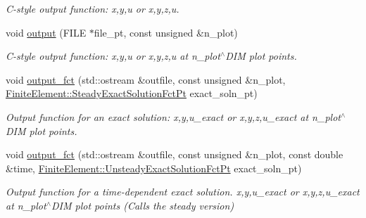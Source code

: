 \begin{DoxyCompactItemize}
\begin{DoxyCompactList}\small\item\em C-\/style output function\+: x,y,u or x,y,z,u. \end{DoxyCompactList}\item 
void \hyperlink{classoomph_1_1QSpectralPoissonElement_aa3a03bc9793e976facde1a49396f5b43}{output} (F\+I\+LE $\ast$file\+\_\+pt, const unsigned \&n\+\_\+plot)
\begin{DoxyCompactList}\small\item\em C-\/style output function\+: x,y,u or x,y,z,u at n\+\_\+plot$^\wedge$\+D\+IM plot points. \end{DoxyCompactList}\item 
void \hyperlink{classoomph_1_1QSpectralPoissonElement_a112f8c43964b2514296974a90dc4b587}{output\+\_\+fct} (std\+::ostream \&outfile, const unsigned \&n\+\_\+plot, \hyperlink{classoomph_1_1FiniteElement_a690fd33af26cc3e84f39bba6d5a85202}{Finite\+Element\+::\+Steady\+Exact\+Solution\+Fct\+Pt} exact\+\_\+soln\+\_\+pt)
\begin{DoxyCompactList}\small\item\em Output function for an exact solution\+: x,y,u\+\_\+exact or x,y,z,u\+\_\+exact at n\+\_\+plot$^\wedge$\+D\+IM plot points. \end{DoxyCompactList}\item 
void \hyperlink{classoomph_1_1QSpectralPoissonElement_aa18ae34af7cc2aee225d5e30a76edb10}{output\+\_\+fct} (std\+::ostream \&outfile, const unsigned \&n\+\_\+plot, const double \&time, \hyperlink{classoomph_1_1FiniteElement_ad4ecf2b61b158a4b4d351a60d23c633e}{Finite\+Element\+::\+Unsteady\+Exact\+Solution\+Fct\+Pt} exact\+\_\+soln\+\_\+pt)
\begin{DoxyCompactList}\small\item\em Output function for a time-\/dependent exact solution. x,y,u\+\_\+exact or x,y,z,u\+\_\+exact at n\+\_\+plot$^\wedge$\+D\+IM plot points (Calls the steady version) \end{DoxyCompactList}\end{DoxyCompactItemize}
